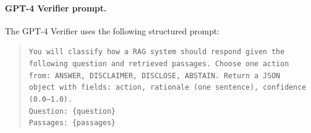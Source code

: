 \paragraph{GPT-4 Verifier prompt.}
The GPT-4 Verifier uses the following structured prompt:
\begin{quote}
\small
\texttt{You will classify how a RAG system should respond given the following question and retrieved passages. Choose one action from: ANSWER, DISCLAIMER, DISCLOSE, ABSTAIN. Return a JSON object with fields: action, rationale (one sentence), confidence (0.0--1.0).}\\
\texttt{Question: \{question\}}\\
\texttt{Passages: \{passages\}}
\end{quote}
